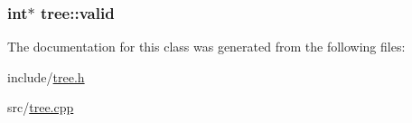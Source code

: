 \hypertarget{classtree_afa8e539406e1f8b373b147682e3a8196}{
\subsubsection[{valid}]{\setlength{\rightskip}{0pt plus 5cm}int$\ast$ tree\+::valid}}\label{classtree_afa8e539406e1f8b373b147682e3a8196}


The documentation for this class was generated from the following files\+:\begin{DoxyCompactItemize}
\item 
include/\hyperlink{tree_8h}{tree.\+h}\item 
src/\hyperlink{tree_8cpp}{tree.\+cpp}\end{DoxyCompactItemize}

